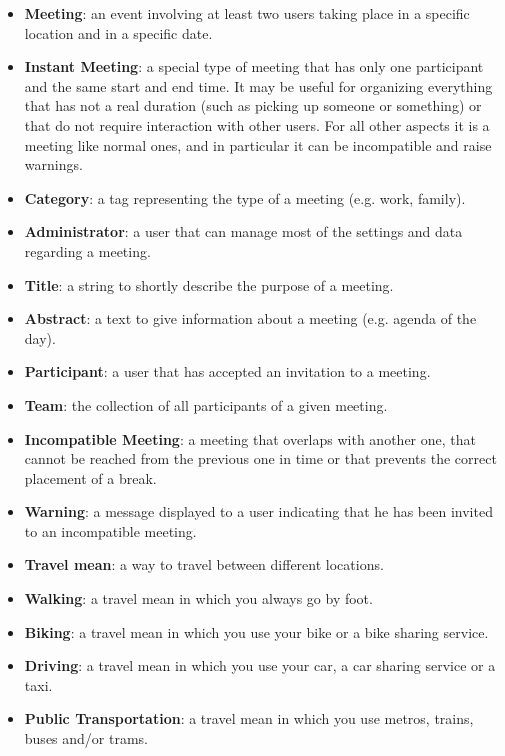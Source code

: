 \begin{itemize}
\item \textbf{Meeting}: an event involving at least two users taking place in a specific location and in a specific date.
\item \textbf{Instant Meeting}: a special type of meeting that has only one participant and the same start and end time. It may be useful for organizing everything that has not a real duration (such as picking up someone or something) or that do not require interaction with other users. For all other aspects it is a meeting like normal ones, and in particular it can be incompatible and raise warnings.
\item \textbf{Category}: a tag representing the type of a meeting (e.g. work, family).
\item \textbf{Administrator}: a user that can manage most of the settings and data regarding a meeting.
\item \textbf{Title}: a string to shortly describe the purpose of a meeting.
\item \textbf{Abstract}: a text to give information about a meeting (e.g. agenda of the day).
\item \textbf{Participant}: a user that has accepted an invitation to a meeting.
\item \textbf{Team}: the collection of all participants of a given meeting.

\item \textbf{Incompatible Meeting}: a meeting that overlaps with another one, that cannot be reached from the previous one in time or that prevents the correct placement of a break.
\item \textbf{Warning}: a message displayed to a user indicating that he has been invited to an incompatible meeting.

\item \textbf{Travel mean}: a way to travel between different locations.
\item \textbf{Walking}: a travel mean in which you always go by foot.
\item \textbf{Biking}: a travel mean in which you use your bike or a bike sharing service.
\item \textbf{Driving}: a travel mean in which you use your car, a car sharing service or a taxi.
\item \textbf{Public Transportation}: a travel mean in which you use metros, trains, buses and/or trams.


\end{itemize}
